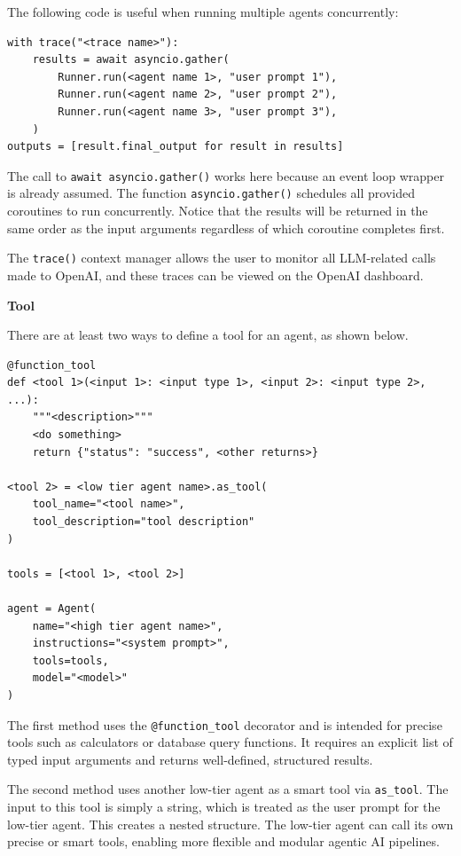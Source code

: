 The following code is useful when running multiple agents concurrently:
\begin{lstlisting}
with trace("<trace name>"):
    results = await asyncio.gather(
        Runner.run(<agent name 1>, "user prompt 1"),
        Runner.run(<agent name 2>, "user prompt 2"),
        Runner.run(<agent name 3>, "user prompt 3"),
    )
outputs = [result.final_output for result in results]
\end{lstlisting}

The call to \texttt{await asyncio.gather()} works here because an event loop wrapper is already assumed. The function \texttt{asyncio.gather()} schedules all provided coroutines to run concurrently. Notice that the results will be returned in the same order as the input arguments regardless of which coroutine completes first. 

The \verb|trace()| context manager allows the user to monitor all LLM-related calls made to OpenAI, and these traces can be viewed on the OpenAI dashboard.

\vspace{0.1in}
\noindent \textbf{Tool}
\vspace{0.1in}

There are at least two ways to define a tool for an agent, as shown below.

\begin{lstlisting}
@function_tool
def <tool 1>(<input 1>: <input type 1>, <input 2>: <input type 2>, ...):
    """<description>"""
    <do something>
    return {"status": "success", <other returns>}

<tool 2> = <low tier agent name>.as_tool(
    tool_name="<tool name>",
    tool_description="tool description"
)

tools = [<tool 1>, <tool 2>]

agent = Agent(
    name="<high tier agent name>",
    instructions="<system prompt>",
    tools=tools,
    model="<model>"
)
\end{lstlisting}

The first method uses the \verb|@function_tool| decorator and is intended for precise tools such as calculators or database query functions. It requires an explicit list of typed input arguments and returns well-defined, structured results.

The second method uses another low-tier agent as a smart tool via \verb|as_tool|. The input to this tool is simply a string, which is treated as the user prompt for the low-tier agent. This creates a nested structure. The low-tier agent can call its own precise or smart tools, enabling more flexible and modular agentic AI pipelines.

